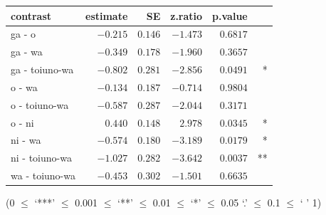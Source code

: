 \begin{table}
 \begin{center}
 \label{Par:PersistencePar:LSMEANST}
 \begin{tabular}{lrrrrr}
 \toprule
 contrast      &    estimate &        SE & z.ratio & p.value & \\
 \midrule
 ga - o         &  $-0.215$ & $0.146$ & $-1.473$ & $0.6817$ & \\
 ga - wa        &  $-0.349$ & $0.178$ & $-1.960$ & $0.3657$ & \\
 ga - toiuno-wa &  $-0.802$ & $0.281$ & $-2.856$ & $0.0491$ & * \\
 o - wa         &  $-0.134$ & $0.187$ & $-0.714$ & $0.9804$ & \\
 o - toiuno-wa  &  $-0.587$ & $0.287$ & $-2.044$ & $0.3171$ & \\
 o - ni         &  $ 0.440$ & $0.148$ & $ 2.978$ & $0.0345$ & * \\
 ni - wa        &  $-0.574$ & $0.180$ & $-3.189$ & $0.0179$ & * \\
 ni - toiuno-wa &  $-1.027$ & $0.282$ & $-3.642$ & $0.0037$ & ** \\
 wa - toiuno-wa &  $-0.453$ & $0.302$ & $-1.501$ & $0.6635$ & \\
 \bottomrule
 \end{tabular}
 \end{center}
 \hfill{(0 $\le$ `***' $\le$ 0.001 $\le$ `**' $\le$ 0.01 $\le$ `*' $\le$ 0.05 `.' $\le$ 0.1 $\le$ ` ' 1)}
\end{table}


